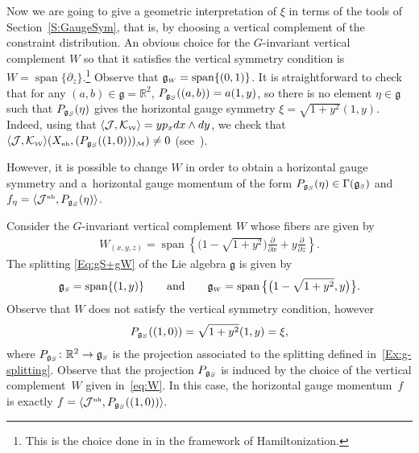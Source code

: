 \documentclass[pdftex]{sigma}
\numberwithin{equation}{section}
\def\W{\mathcal{W}}
\def\M{\mathcal{M}}
\def\J{\mathcal{J}}
\def\R{\mathbb{R}}
\def\g{\mathfrak{g}}
\def\nh{{\mbox{\tiny{nh}}}}
\def\subW{{\mbox{\tiny{$\W$}}}}
\def\subM{{\mbox{\tiny{$\M$}}}}
\def\subSS{{\mbox{\tiny{$S$}}}}
\def\subWW{{\mbox{\tiny{$W$}}}}
\begin{document}
\begin{Example}
Now we are going to give a geometric interpretation of $\xi$ in terms of the tools of Section~\ref{S:GaugeSym},
that is, by choosing a vertical complement of the constraint distribution.
An obvious choice for the $G$-invariant vertical complement
$W$ so that it satisf\/ies the vertical symmetry condition is
$W = \operatorname{span}\{ \partial_z \}$.\footnote{This is the choice
done in \cite{Paula} in the framework of Hamiltonization.}
Observe that $\mathfrak{g}_\subWW = \operatorname{span}\{(0,1)\}$.
It is straightforward to check that for any $(a,b) \in \mathfrak{g} = \R^2$,
 $P_{\mathfrak{g}_\subSS} ((a,b) ) = a (1,y)$, so there is no element
 $\eta\in\mathfrak{g}$ such that $P_{\mathfrak{g}_\subSS} (\eta )$ gives the
horizontal gauge symmetry $\xi= \sqrt{1+y^2}(1,y)$.
Indeed, using that $\langle \mathcal{J},\mathcal{K}_\subW\rangle = yp_x dx\wedge dy$, we check that
$\langle \mathcal{J},\mathcal{K}_\subW\rangle (X_{\nh},( P_{\mathfrak{g}_\subSS}((1,0)))_\subM )\neq 0$ (see~\cite{Paula}).

However, it is possible to change $W$ in order to obtain a horizontal gauge symmetry
and a~horizontal gauge momentum of the form
$P_{\mathfrak{g}_\subSS}(\eta) \in \Gamma(\mathfrak{g}_\subSS)$
and $f_\eta= \langle \J^\nh, P_{\mathfrak{g}_\subSS}(\eta) \rangle$.

Consider the $G$-invariant vertical complement $W$ whose f\/ibers are given by
\begin{gather}\label{eq:W}
 W_{(x,y,z)}= \operatorname{span} \left\{ \big(1-\sqrt{1+y^ 2}\big) \frac{\partial}{\partial x} + y \frac{\partial}{\partial z} \right\}.
\end{gather}
The splitting  \eqref{Eq:gS+gW} of the Lie algebra $\g$ is given by
\begin{gather} \label{Ex:g-splitting}
 \mathfrak{g}_\subSS = \operatorname{span} \{ (1,y)\} \qquad \mbox{and} \qquad \mathfrak{g}_\subWW = \operatorname{span}\big\{\big(1-\sqrt{1+y^ 2} ,y\big)\big\}  .
\end{gather}
Observe that $W$ does not satisfy the vertical symmetry condition, however
\begin{gather*}
  P_{\mathfrak{g}_\subSS} ((1,0)) = \sqrt{1+y^2}(1,y) = \xi,
\end{gather*}
where $P_{\mathfrak{g}_\subSS} \colon \R^2 \to \mathfrak{g}_\subSS$ is the projection
associated to the splitting def\/ined in~\eqref{Ex:g-splitting}.
Observe that the projection $P_{\mathfrak{g}_\subSS}$ is induced by the choice of the vertical complement~$W$ given in~\eqref{eq:W}.
In this case, the horizontal gauge momentum~$f$ is exactly
$f = \langle \J^\nh, P_{\mathfrak{g}_\subSS}((1,0)) \rangle.$
\end{Example}
\end{document}
